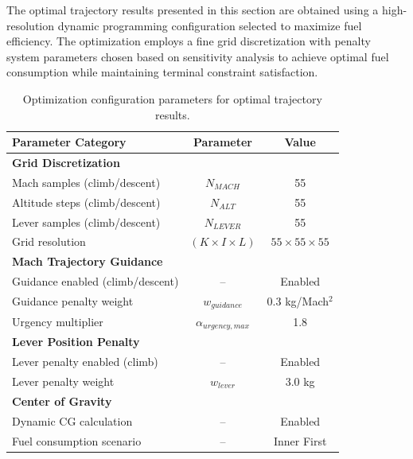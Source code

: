 The optimal trajectory results presented in this section are obtained using a high-resolution dynamic programming configuration selected to maximize fuel efficiency. The optimization employs a fine grid discretization with penalty system parameters chosen based on sensitivity analysis to achieve optimal fuel consumption while maintaining terminal constraint satisfaction.

\begin{table}[h]
    \centering
    \footnotesize
    \caption{Optimization configuration parameters for optimal trajectory results.}
    \label{tab:optimal_trajectory_configuration}
    \begin{tabular}{l c c}
        \hline
        Parameter Category & Parameter & Value \\
        \hline
        \textbf{Grid Discretization} & & \\
        Mach samples (climb/descent) & $N_{MACH}$ & 55 \\
        Altitude steps (climb/descent) & $N_{ALT}$ & 55 \\
        Lever samples (climb/descent) & $N_{LEVER}$ & 55 \\
        Grid resolution & $(K \times I \times L)$ & $55 \times 55 \times 55$ \\
        \hline
        \textbf{Mach Trajectory Guidance} & & \\
        Guidance enabled (climb/descent) & -- & Enabled \\
        Guidance penalty weight & $w_{guidance}$ & 0.3 kg/Mach$^2$ \\
        Urgency multiplier & $\alpha_{urgency,max}$ & 1.8 \\
        \hline
        \textbf{Lever Position Penalty} & & \\
        Lever penalty enabled (climb) & -- & Enabled \\
        Lever penalty weight & $w_{lever}$ & 3.0 kg \\
        \hline
        \textbf{Center of Gravity} & & \\
        Dynamic CG calculation & -- & Enabled \\
        Fuel consumption scenario & -- & Inner First \\
        \hline
    \end{tabular}
\end{table}

